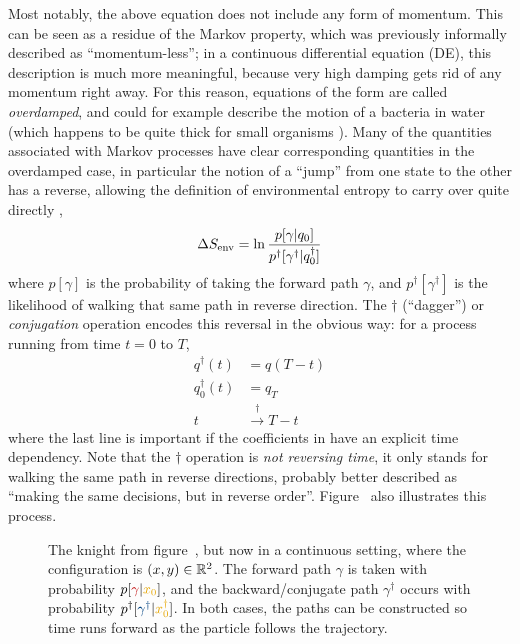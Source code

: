 Most notably, the above equation does not include any form of momentum. This can be seen as a residue of the Markov property, which was previously informally described as ``momentum-less''; in a continuous differential equation (DE), this description is much more meaningful, because very high damping gets rid of any momentum right away. For this reason, equations of the form  are called \emph{overdamped}, and could for example describe the motion of a bacteria in water (which happens to be quite thick for small organisms \cite{sengupta}). Many of the quantities associated with Markov processes have clear corresponding quantities in the overdamped case, in particular the notion of a ``jump'' from one state to the other has a reverse, allowing the definition of environmental entropy to carry over quite directly \cite{seifert-overdamped},
%
\begin{equation}
	\Delta S_\text{env} = \ln\frac{p[\gamma | q_0]}{p^\dagger[\gamma^\dagger | q_0^\dagger]}
\end{equation}
%
where \(p[\gamma]\) is the probability of taking the forward path \(\gamma\), and \(p^\dagger[\gamma^\dagger]\) is the likelihood of walking that same path in reverse direction. The \(\dagger\) (``dagger'') or \emph{conjugation} operation encodes this reversal in the obvious way: for a process running from time \(t=0\) to \(T\),
%
\begin{equation}
	\begin{split}
		q^\dagger(t) &= q(T-t) \\
		q_0^\dagger(t) &= q_T \\
		t &\overset\dagger\rightarrow T-t
	\end{split}
\end{equation}
%
where the last line is important if the coefficients in  have an explicit time dependency. Note that the \(\dagger\) operation is \emph{not reversing time}, it only stands for walking the same path in reverse directions, probably better described as ``making the same decisions, but in reverse order''. Figure~ also illustrates this process.

\begin{figure}[htbp]
	\centering
	
	\caption[]{
		The knight from figure~, but now in a continuous setting, where the configuration is \((x,y)\in\mathbb{R}^2\). The {\color{red}forward path \(\gamma\)} is taken with probability \(p[{\color{red}\gamma}|{\color{yellow}x_0}]\), and the {\color{blue}backward/conjugate path \(\gamma^\dagger\)} occurs with probability \(p^\dagger[{\color{blue}\gamma^\dagger}|{\color{yellow}x_0^\dagger}]\). In both cases, the paths can be constructed so time runs forward as the particle follows the trajectory.
	}
	\label{fig:knight continuous}
\end{figure}


